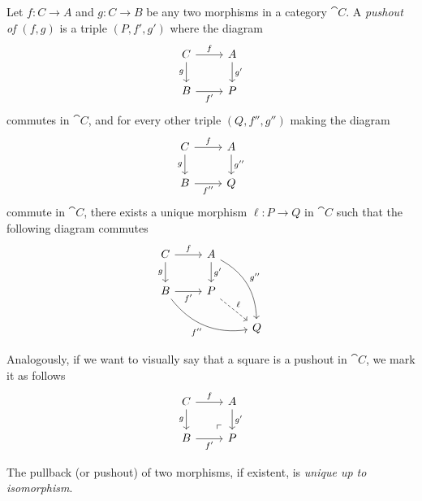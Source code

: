 \begin{definition}[Pushout]
    \label{def:pushout}
    Let \(f: C \to A\) and \(g: C \to B\) be any two morphisms in a category
    \(\cat C\). A \emph{pushout of \((f, g)\)} is a triple \((P, f', g')\)
    where the diagram
    \[
        \begin{tikzcd}
            C \ar[r, "f"] \ar[d, "g"'] &A \ar[d, "g'"] \\
            B \ar[r, "f'"'] &P
        \end{tikzcd}
    \]
    commutes in \(\cat C\), and for every other triple \((Q, f'', g'')\) making the
    diagram
    \[
        \begin{tikzcd}
            C \ar[r, "f"] \ar[d, "g"'] &A \ar[d, "g''"] \\
            B \ar[r, "f''"'] &Q
        \end{tikzcd}
    \]
    commute in \(\cat C\), there exists a unique morphism \(\ell: P \to Q\) in
    \(\cat C\) such that the following diagram commutes
    \[
        \begin{tikzcd}
            C \ar[r, "f"] \ar[d, "g"']
            &A \ar[d, "g'"] \ar[drd, bend left, "g''"]
            &
            \\
            B \ar[r, "f'"'] \ar[rrd, bend right, "f''"']
            &P \ar[dr, dashed, "\ell"]
            &
            \\
            & &Q
        \end{tikzcd}
    \]
\end{definition}

Analogously, if we want to visually say that a square is a pushout in \(\cat
C\), we mark it as follows
\[
    \begin{tikzcd}
        C \ar[r, "f"] \ar[d, "g"'] &A \ar[d, "g'"] \\
        B \ar[r, "f'"'] &P \ar[lu, phantom, "\ulcorner", very near start]
    \end{tikzcd}
\]

\begin{proposition}[Uniqueness]
    \label{prop:pullback-pushout-uniqueness}
    The pullback (or pushout) of two morphisms, if existent, is \emph{unique up to
        isomorphism}.
\end{proposition}

